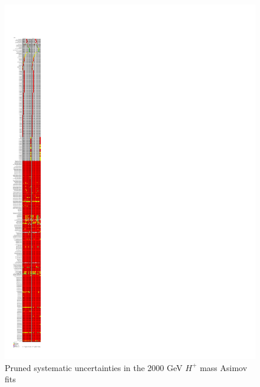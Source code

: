 \begin{figure}[H]
  \centering
  \includegraphics[keepaspectratio, scale=0.85]{images/Pruning/Pruning_Asimov_Hp2000_Contained80_DL1r_70.pdf}
  \caption{Pruned systematic uncertainties in the 2000 GeV $H^{+}$ mass Asimov fits}
  \label{fig:Pruning_Asimov_Hp2000_Contained80_DL1r_70}
\end{figure}


